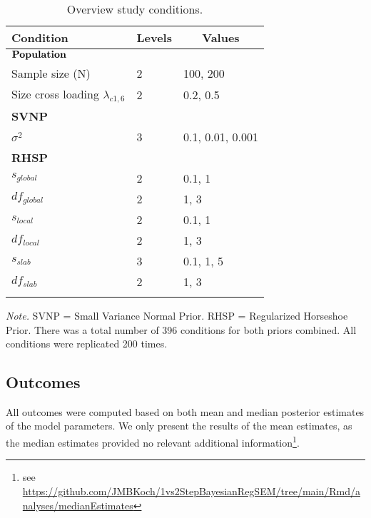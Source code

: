 \documentclass[
  man, donotrepeattitle,floatsintext]{apa6}
\begin{document}
\begin{table}[tbp]

\begin{center}
\begin{threeparttable}

\caption{\label{tab:unnamed-chunk-2}Overview study conditions.}

\begin{tabular}{lll}
\toprule
Condition & \multicolumn{1}{c}{Levels} & \multicolumn{1}{c}{Values}\\
\midrule
$\bf{Population}$ &  & \\
Sample size (N) & 2 & 100, 200\\
Size cross loading $\lambda_{c1 , 6}$ & 2 & 0.2, 0.5\\
\bf{SVNP} &  & \\
$\sigma^2$ & 3 & 0.1, 0.01, 0.001\\
\bf{RHSP} &  & \\
$s_{global}$ & 2 & 0.1, 1\\
$df_{global}$ & 2 & 1, 3\\
$s_{local}$ & 2 & 0.1, 1\\
$df_{local}$ & 2 & 1, 3\\
$s_{slab}$ & 3 & 0.1, 1, 5\\
$df_{slab}$ & 2 & 1, 3\\
\bottomrule
\addlinespace
\end{tabular}

\begin{tablenotes}[para]
\normalsize{\textit{Note.} SVNP = Small Variance Normal Prior. RHSP = Regularized Horseshoe Prior. There was a total number of 396 conditions for both priors combined.  All conditions were replicated 200 times.}
\end{tablenotes}

\end{threeparttable}
\end{center}

\end{table}

\hypertarget{outcomes}{%
\subsection{Outcomes}\label{outcomes}}

All outcomes were computed based on both mean and median posterior
estimates of the model parameters. We only present the results of the
mean estimates, as the median estimates provided no relevant additional
information\footnote{see
  \url{https://github.com/JMBKoch/1vs2StepBayesianRegSEM/tree/main/Rmd/analyses/medianEstimates}}.
\end{document}
